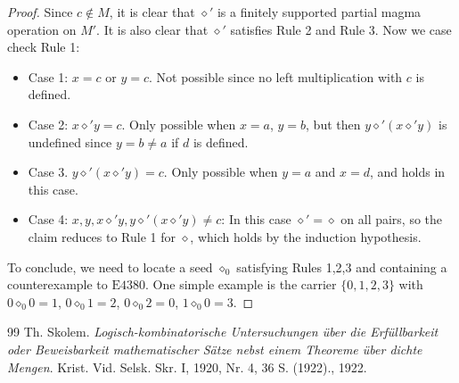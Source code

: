 \documentclass[10pt,a4paper]{amsart}
\newcommand{\Eq}[1]{\mathrm{E}#1}
\newcommand{\op}{\diamond}
\begin{document}
\begin{proof}
Since $c \not \in M$, it is clear that $\op'$ is a finitely supported partial magma operation on $M'$.  It is also clear that $\op'$ satisfies Rule 2 and Rule 3.   Now we case check Rule 1:
\begin{itemize}
\item Case 1: $x=c$ or $y=c$.  Not possible since no left multiplication with $c$ is defined.
\item Case 2: $x \op' y = c$.  Only possible when $x = a$, $y = b$, but then $y \op' (x \op' y)$ is undefined since $y = b \neq a$ if $d$ is defined.
\item Case 3. $y \op' (x \op' y) = c$.  Only possible when $y=a$ and $x=d$, and holds in this case.
\item Case 4: $x, y, x \op' y, y \op' (x \op' y) \neq c$: In this case $\op'=\op$ on all pairs, so the claim reduces to Rule 1 for $\op$, which holds by the induction hypothesis.
\end{itemize}
To conclude, we need to locate a seed $\op_0$ satisfying Rules 1,2,3 and containing a counterexample to $\Eq{4380}$.  One simple example is the carrier $\{0,1,2,3\}$ with $0 \op_0 0 = 1$, $0 \op_0 1 = 2$, $0 \op_0 2 = 0$, $1 \op_0 0 = 3$.
\end{proof}

\begin{thebibliography}{99}
 Th. Skolem. \emph{Logisch-kombinatorische Untersuchungen \"uber die Erf\"ullbarkeit oder Beweisbarkeit mathematischer S\"atze nebst einem Theoreme \"uber dichte Mengen}. Krist. Vid. Selsk. Skr. I, 1920, Nr. 4, 36 S. (1922)., 1922.
\end{thebibliography}
\end{document}
